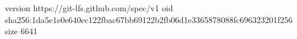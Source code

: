 version https://git-lfs.github.com/spec/v1
oid sha256:1da5e1e0e640ec122fbac67bb69122b2fb06d1e3365878088fc696323201f256
size 6641
